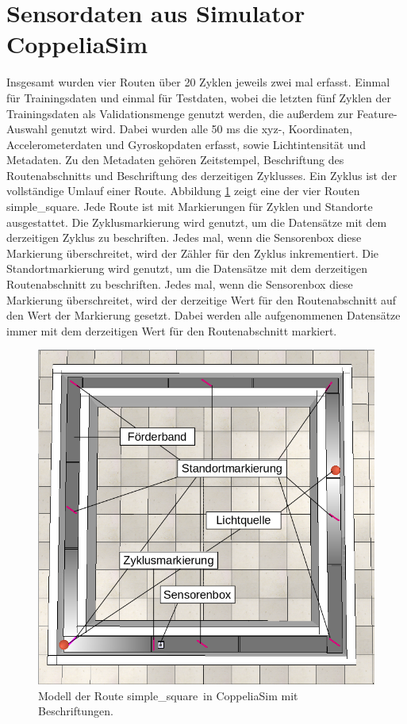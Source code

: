 \section{Sensordaten aus Simulator CoppeliaSim}
Insgesamt wurden vier Routen über 20 Zyklen jeweils zwei mal erfasst.
Einmal für Trainingsdaten und einmal für Testdaten, wobei die letzten fünf Zyklen der
Trainingsdaten als Validationsmenge genutzt werden, die außerdem zur Feature-Auswahl genutzt wird.
Dabei wurden alle 50 ms die xyz-, Koordinaten, Accelerometerdaten und Gyroskopdaten erfasst, sowie Lichtintensität und Metadaten.
Zu den Metadaten gehören Zeitstempel, Beschriftung des Routenabschnitts und Beschriftung des derzeitigen Zyklusses.
Ein Zyklus ist der vollständige Umlauf einer Route.
\newpage
Abbildung \ref{fig:simple_square_labeled} zeigt eine der vier Routen \glqq simple\_square\grqq.
Jede Route ist mit Markierungen für Zyklen und Standorte ausgestattet.
Die Zyklusmarkierung wird genutzt, um die Datensätze mit dem derzeitigen Zyklus zu beschriften.
Jedes mal, wenn die Sensorenbox diese Markierung überschreitet, wird der Zähler für den Zyklus inkrementiert.
Die Standortmarkierung wird genutzt, um die Datensätze mit dem derzeitigen Routenabschnitt zu beschriften.
Jedes mal, wenn die Sensorenbox diese Markierung überschreitet, wird der derzeitige Wert für den Routenabschnitt auf den Wert der Markierung gesetzt.
Dabei werden alle aufgenommenen Datensätze immer mit dem derzeitigen Wert für den Routenabschnitt markiert.
\begin{figure}[h!]
    \centering
    \includegraphics[width=\linewidth]{images/simple_square_labeled.png}
    \caption{Modell der Route \glqq simple\_square\grqq\ in CoppeliaSim mit Beschriftungen.}
    \label{fig:simple_square_labeled}
\end{figure}

